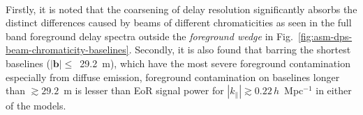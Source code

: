 \documentclass[preprint2,iop,numberedappendix,twocolappendix,appendixfloats]{emulateapj}
\begin{document}
\begin{figure}[htb]
\centering
{} \\
\label{fig:subbands}
\end{figure}


Firstly, it is noted that the coarsening of delay resolution significantly absorbs the distinct differences caused by beams of different chromaticities as seen in the full band foreground delay spectra outside the {\it foreground wedge} in Fig.~\ref{fig:asm-dps-beam-chromaticity-baselines}. Secondly, it is also found that barring the shortest baselines ($|\boldsymbol{b}| \leq $~29.2~m), which have the most severe foreground contamination especially from diffuse emission, foreground contamination on baselines longer than $\gtrsim 29.2$~m is lesser than EoR signal power for $|k_\parallel| \gtrsim 0.22\,h$~Mpc$^{-1}$ in either of the models. 
\end{document}
